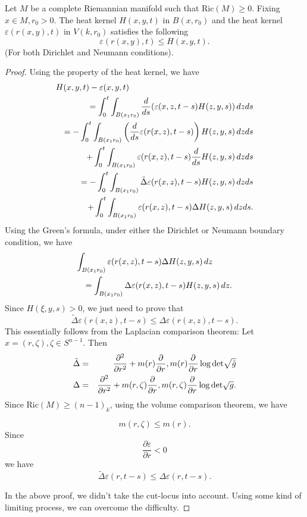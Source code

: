 \begin{theorem} Let $M$ be a complete Riemannian manifold such that  Ric$(M) \geq 0$. Fixing $ x \in M , r_0 > 0 $. The heat kernel $ H (x, y, t) $ in $ B(x, r_0) $ and the heat kernel $ \varepsilon (r (x, y) , t) $ in $ V (k, r_0) $ satisfies the following
%
\[ \varepsilon (r (x, y) , t) \leq H (x, y, t). \]
%
(For both Dirichlet and Neumann conditions).
\end{theorem}
\begin{proof} Using the property of the heat kernel, we have 
%
\begin{eqnarray*}
\lefteqn{H(x, y, t) - \varepsilon (x, y, t)} \\
&&= \int ^t _0 \int _{B (x_1 r_0)} \frac{d}{ds}  ( \varepsilon (x, z, t - s) H (z, y, s) ) \, d z ds\\
&&= - \int ^t _0 \int _{B (x_1 r_0) }\left( \frac{d}{ds}\varepsilon (r (x, z), t-s)\right) H(z, y, s)  \, d z ds\\
&&+ \int^t_0 \int _{B (x_1 r_0) }\varepsilon (r (x, z), t-s)\frac{d}{ds} H(z, y, s)  \, d z ds \\
&&= - \int^t_0 \int _{B (x_1 r_0)} \tilde{\Delta} \varepsilon (r (x, z), t - s) H(z, y, s)  \, d z ds\\
&&+ \int^t_0 \int _{B (x_1 r_0)}\varepsilon (r (x, z), t - s) \Delta H(z, y, s)  \, d z ds.
\end{eqnarray*}
Using the Green's formula, under either the Dirichlet or Neumann boundary condition, we have 
%
\begin{eqnarray*}
\lefteqn{\int _{B (x_1 r_0)}\varepsilon (r (x, z), t - s) \Delta H(z, y, s)  \, d z}\\
&&= \int _{B (x_1 r_0)}\Delta \varepsilon (r (x, z), t - s)  H(z, y, s)  \, d z.
\end{eqnarray*}
%
Since $ H(\xi, y, s)  > 0 $, we just need to prove that
%
\[ \tilde{\Delta} \varepsilon (r (x, z), t - s)\leq \Delta  \varepsilon (r (x, z), t - s).\]
%
This essentially follows from the Laplacian comparison theorem: Let $ x = (r, \zeta ) , \zeta \in S^{n-1} $. Then 
%
\begin{eqnarray*}
\tilde{\Delta } & = & \frac{\partial ^2}{\partial r^2} + m (r) \frac{\partial }{\partial r} , m (r) \frac{\partial }{\partial r} \log {\rm det} \sqrt{\tilde{g}}\\
\Delta & = & \frac{\partial ^2}{\partial r^2} + m (r,\zeta) \frac{\partial }{\partial r} , m (r,\zeta) \frac{\partial }{\partial r} \log {\rm det} \sqrt{{g}}.
\end{eqnarray*}
%
Since Ric$(M) \geq (n-1)_k$, using the volume comparison theorem, we have 

\[ m (r, \zeta ) \leq m (r). \]
%
Since 
\[ \frac{\partial \varepsilon}{\partial r} < 0 \]
%
we have 
%
\[ \tilde{\Delta} \varepsilon (r, t-s) \leq \Delta \varepsilon (r, t - s). \]

In the above proof, we didn't take the cut-locus into account. Using some kind of limiting process, we can overcome the difficulty.
\end{proof}


